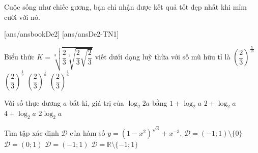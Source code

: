 \begin{name}
	{\tenchude}
	{\tendethi}
	{\tentruong}
	{Cuộc sống như chiếc gương, bạn chỉ nhận được kết quả tốt đẹp nhất khi mỉm cười với nó.}
\end{name}
[ans/ansbookDe2]
\TN
{}[ans/ansDe2-TN1]
\begin{ex}%
Biểu thức $K=\sqrt[3]{\dfrac{2}{3}\sqrt[3]{\dfrac{2}{3}\sqrt{\dfrac{2}{3}}}}$ viết dưới dạng luỹ thừa với số mũ hữu tỉ là
\choice
{$\left(\dfrac{2}{3}\right)^{\frac{5}{18}}$}
{\True $\left(\dfrac{2}{3}\right)^{\frac{1}{2}}$}
{$\left(\dfrac{2}{3}\right)^{\frac{1}{8}}$}
{$\left(\dfrac{2}{3}\right)^{\frac{1}{6}}$}
\end{ex}

\begin{ex}%
Với số thực dương $a$ bất kì, giá trị của $\log_2{2a}$ bằng
\choice
{\True $ 1+ \log_2{a}$}
{$2+ \log_2{a}$}
{$4+ \log_2{a} $}
{$2\log_2{a}$}
\end{ex}

\begin{ex}%
Tìm tập xác định $\mathscr{D}$ của hàm số $y=\left(1-x^2\right)^{\sqrt{3}}+x^{-3}$.
\choice
{\True$\mathscr{D}=(-1 ; 1) \setminus\{0\}$}
{$\mathscr{D}=(0 ; 1)$}	{$\mathscr{D}=(-1 ; 1)$} {$\mathscr{D}=\mathbb{R}\setminus\{-1 ; 1\}$}
\end{ex}

